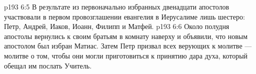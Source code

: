 \vs p193 6:5 В результате из первоначально избранных двенадцати апостолов участвовали в первом провозглашении евангелия в Иерусалиме лишь шестеро: Петр, Андрей, Иаков, Иоанн, Филипп и Матфей.
\vs p193 6:6 \pc Около полудня апостолы вернулись к своим братьям в комнату наверху и объявили, что новым апостолом был избран Матиас. Затем Петр призвал всех верующих к молитве --- молитве о том, чтобы они могли приготовиться к принятию дара духа, который обещал им послать Учитель.
